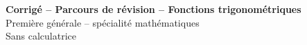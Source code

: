 \documentclass[11pt,a4paper]{article}
\newcommand{\tagcol}[2]{\begin{tcolorbox}[enhanced,colback=#1!11,colframe=#1!45!black,boxrule=0.42pt,arc=2mm,left=1mm,right=1mm,top=0.45mm,bottom=0.45mm,before skip=0mm,after skip=0.85mm,fontupper=\bfseries\scriptsize,colupper=#1!55!black]\centering #2\end{tcolorbox}}
\newcommand{\titrepage}{\begin{tcolorbox}[colback=white,colframe=bleu!70!black,boxrule=0.65pt,arc=3mm,left=2.5mm,right=2.5mm,top=1.15mm,bottom=1.15mm,before skip=0mm,after skip=1.4mm,drop fuzzy shadow=black!10]
{\Large\bfseries Parcours de révision -- Fonctions trigonométriques}\hfill {\normalsize Première spécialité -- sans calculatrice}
\end{tcolorbox}}
\begin{document}
\begin{center}
{\LARGE\bfseries Corrigé -- Parcours de révision -- Fonctions trigonométriques}\\[1mm]
{\large Première générale -- spécialité mathématiques}\\[1mm]
{\normalsize Sans calculatrice}
\end{center}
\tableofcontents\newpage

\newcommand{\ficheRecap}{%
\begin{landscape}
\pagecolor{fondpage}
\thispagestyle{empty}
\titrepage
\begin{tabularx}{\linewidth}{@{}X@{\hspace{1.8mm}}X@{\hspace{1.8mm}}X@{\hspace{1.8mm}}X@{}}
\begin{panel}{}
\tagcol{bleu}{Cercle et radian}
\begin{fichebox}{bleu}{Cercle trigonométrique}
Cercle de centre $O$, de rayon $1$, orienté dans le sens direct.


\end{fichebox}
\end{panel}
\end{tabularx}
\end{landscape}}
\end{document}
